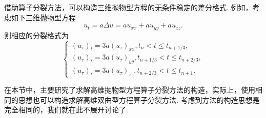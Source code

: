 借助算子分裂方法，可以构造三维抛物型方程的无条件稳定的差分格式. 例如，考虑如下三维抛物型方程
\begin{equation*}
    u_t=a\Delta u = au_{xx} + au_{yy} + au_{zz}.
\end{equation*}
则相应的分裂格式为
\begin{equation*}
    \begin{cases}
        (u_\tau)_t=3a(u_\tau)_{xx},t_n<t\leq t_{n+1/3}, \\
        (u_\tau)_t=3a(u_\tau)_{yy},t_{n+1/3}<t\leq t_{n+2/3}, \\
        (u_\tau)_t=3a(u_\tau)_{zz},t_{n+2/3}<t\leq t_{n+1}.
    \end{cases}
\end{equation*}

在本节中，主要研究了求解高维抛物型方程算子分裂方法的构造，实际上，使用相同的思想也可以构造求解高维双曲型方程算子分裂方法. 考虑到方法的构造思想是完全相同的，我们就在此不展开讨论了.






